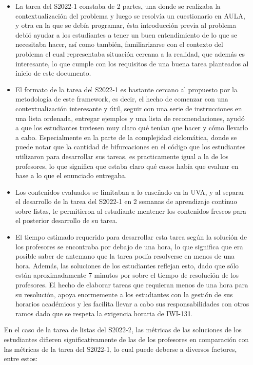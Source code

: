 \documentclass[letterpaper,12pt]{article}
\begin{document}
\begin{itemize}
  \item La tarea del S2022-1 constaba de 2 partes, una donde se realizaba la contextualización del problema y luego se resolvía un cuestionario en AULA, y otra en la que se debía programar, ésta introducción previa al problema debió ayudar a los estudiantes a tener un buen entendimiento de lo que se necesitaba hacer, así como también, familiarizarse con el contexto del problema el cual representaba situación cercana a la realidad, que además es interesante, lo que cumple con los requisitos de una buena tarea planteados al inicio de este documento.
  \item El formato de la tarea del S2022-1 es bastante cercano al propuesto por la metodología de este framework, es decir, el hecho de comenzar con una contextualización interesante y útil, seguir con una serie de instrucciones en una lista ordenada, entregar ejemplos y una lista de recomendaciones, ayudó a que los estudiantes tuviesen muy claro qué tenían que hacer y cómo llevarlo a cabo. Especialmente en la parte de la complejidad ciclomática, donde se puede notar que la cantidad de bifurcaciones en el código que los estudiantes utilizaron para desarrollar sus tareas, es practicamente igual a la de los profesores, lo que significa que estaba claro qué casos había que evaluar en base a lo que el enunciado entregaba.
  \item Los contenidos evaluados se limitaban a lo enseñado en la UVA, y al separar el desarrollo de la tarea del S2022-1 en 2 semanas de aprendizaje contínuo sobre listas, le permitieron al estudiante mentener los contenidos frescos para el posterior desarrollo de su tarea.
  \item El tiempo estimado requerido para desarrollar esta tarea según la solución de los profesores se encontraba por debajo de una hora, lo que significa que era posible saber de antemano que la tarea podía resolverse en menos de una hora. Además, las soluciones de los estudiantes reflejan esto, dado que sólo están aproximadamente 7 minutos por sobre el tiempo de resolución de los profesores. El hecho de elaborar tareas que requieran menos de una hora para su resolución, apoya enormemente a los estudiantes con la gestión de sus horarios académicos y les facilita llevar a cabo sus responsabilidades con otros ramos dado que se respeta la exigencia horaria de IWI-131.
\end{itemize}

En el caso de la tarea de listas del S2022-2, las métricas de las soluciones de los estudiantes difieren significativamente de las de los profesores en comparación con las métricas de la tarea del S2022-1, lo cual puede deberse a diversos factores, entre estos:
\end{document}
